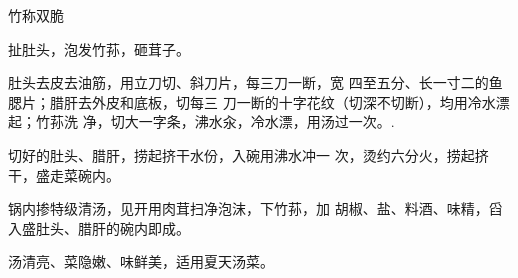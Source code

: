 \begin{recipe}{竹称双脆}

\ingredients



\cooking

\step 扯肚头，泡发竹荪，砸茸子。

肚头去皮去油筋，用立刀切、斜刀片，每三刀一断，宽 四至五分、长一寸二的鱼腮片；腊肝去外皮和底板，切每三 刀一断的十字花纹（切深不切断），均用冷水漂起；竹荪洗 净，切大一字条，沸水汆，冷水漂，用汤过一次。.

\step 	切好的肚头、腊肝，捞起挤干水份，入碗用沸水冲一 次，烫约六分火，捞起挤干，盛走菜碗内。

\step 	锅内掺特级清汤，见开用肉茸扫净泡沫，下竹荪，加 胡椒、盐、料酒、味精，舀入盛肚头、腊肝的碗内即成。

\notes

汤清亮、菜隐嫩、味鲜美，适用夏天汤菜。

\end{recipe}

